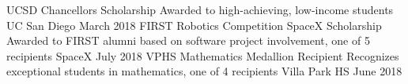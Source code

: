 \documentclass[]{awesome-cv}
\begin{document}
\vspace{-5mm}
\begin{cvhonors}
	\cvhonor
	{UCSD Chancellor\textquotesingle{}s Scholarship}
	{Awarded to high-achieving, low-income students}
	{UC San Diego}
	{March 2018}
	\cvhonor
	{FIRST Robotics Competition SpaceX Scholarship}
	{Awarded to FIRST alumni based on software project involvement, one of 5
    recipients}
	{SpaceX}
	{July 2018}
	\cvhonor
	{VPHS Mathematics Medallion Recipient}
	{Recognizes exceptional students in mathematics, one of 4 recipients}
	{Villa Park HS}
	{June 2018}
\end{cvhonors}
\end{document}
